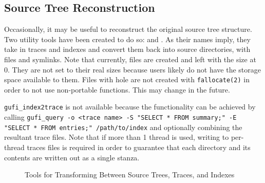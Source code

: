 \subsection{Source Tree Reconstruction}

Occasionally, it may be useful to reconstruct the original source tree
structure. Two utility tools have been created to do so: \gufitracedir
and \gufiindexdir. As their names imply, they take in traces and indexes
and convert them back into source directories, with files and
symlinks. Note that currently, files are created and left with the
size at 0. They are not set to their real sizes because users likely
do not have the storage space available to them. Files with hole are
not created with \texttt{fallocate(2)} in order to not use
non-portable functions. This may change in the future.

\texttt{gufi\_index2trace} is not available because the functionality
can be achieved by calling \texttt{gufi\_query -o <trace name> -S
  "SELECT * FROM summary;" -E "SELECT * FROM entries;"
  /path/to/index} and optionally combining the resultant trace
files. Note that if more than 1 thread is used, writing to per-thread
traces files is required in order to guarantee that each
directory and its contents are written out as a single stanza.

\begin{figure}[H]
\centering
{}
\caption{Tools for Transforming Between Source Trees, Traces, and Indexes}
\end{figure}

